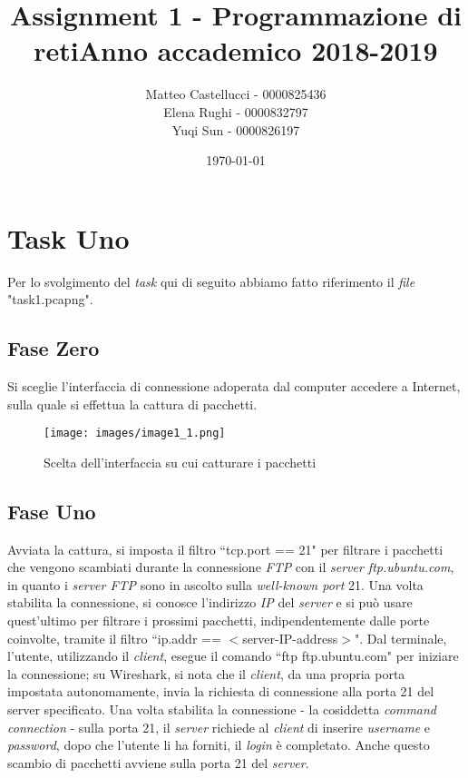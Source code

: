 \documentclass[a4paper, 12pt]{report}
\title{Assignment 1 - Programmazione di reti\newline Anno accademico 2018-2019}
\date{\today}
\author{Matteo Castellucci - 0000825436\\Elena Rughi - 0000832797\\Yuqi Sun - 0000826197\newline}
\begin{document}
\maketitle

\tableofcontents

\chapter{Task Uno}

Per lo svolgimento del \textit{task} qui di seguito abbiamo fatto riferimento il \textit{file} "task1.pcapng".

\section{Fase Zero}

Si sceglie l’interfaccia di connessione adoperata dal computer accedere a Internet, sulla quale si effettua la cattura di pacchetti.

\begin{figure}[H]
	\centering
	\texttt{[image: images/image1\_1.png]}
	\caption{Scelta dell'interfaccia su cui catturare i pacchetti}
\end{figure}
 
\section{Fase Uno}

Avviata la cattura, si imposta il filtro ``tcp.port == 21" per filtrare i pacchetti che vengono scambiati durante la connessione \textit{FTP} con il \textit{server ftp.ubuntu.com}, in quanto i 
\textit{server FTP} sono in ascolto sulla \textit{well-known port} 21. Una volta stabilita la connessione, si conosce l’indirizzo \textit{IP} del \textit{server} e si può usare quest’ultimo per
filtrare i prossimi pacchetti, indipendentemente dalle porte coinvolte, tramite il filtro ``ip.addr == $<$server-IP-address$>$". Dal terminale, l'utente, utilizzando il \textit{client}, esegue il
comando ``ftp ftp.ubuntu.com" per iniziare la connessione; su Wireshark, si nota che il \textit{client}, da una propria porta impostata autonomamente, invia la richiesta di connessione alla porta
21 del server specificato. Una volta stabilita la connessione - la cosiddetta \textit{command connection} - sulla porta 21, il \textit{server} richiede al \textit{client} di inserire \textit{username}
e \textit{password}, dopo che l'utente li ha forniti, il \textit{login} è completato. Anche questo scambio di pacchetti avviene sulla porta 21 del \textit{server}.
\end{document}
